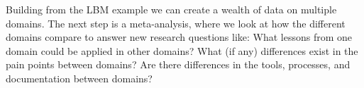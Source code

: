 \documentclass[runningheads]{llncs}
\begin{document}
Building from the LBM example we can create a wealth of data on multiple
domains.  The next step is a meta-analysis, where we look at how the different
domains compare to answer new research questions like: What lessons from one
domain could be applied in other domains? What (if any) differences exist in the
pain points between domains?  Are there differences in the tools, processes, and
documentation between domains?

%
%
%


%




\end{document}
